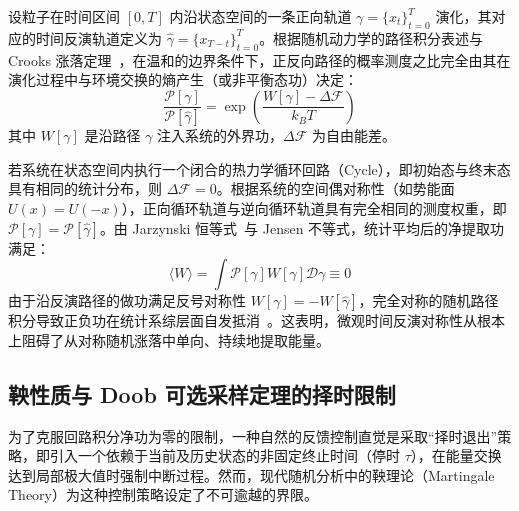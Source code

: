 ﻿\documentclass[10pt,a4paper]{article}
\numberwithin{equation}{section}
\begin{document}
设粒子在时间区间 $[0, T]$ 内沿状态空间的一条正向轨道 $\gamma = \{x_t\}_{t=0}^T$ 演化，其对应的时间反演轨道定义为 $\hat{\gamma} = \{x_{T-t}\}_{t=0}^T$。根据随机动力学的路径积分表述与 Crooks 涨落定理~\cite{Crooks1999}，在温和的边界条件下，正反向路径的概率测度之比完全由其在演化过程中与环境交换的熵产生（或非平衡态功）决定：
\begin{equation}
    \frac{\mathcal{P}[\gamma]}{\mathcal{P}[\hat{\gamma}]} = \exp\left( \frac{W[\gamma] - \Delta \mathcal{F}}{k_B T} \right)
\end{equation}
其中 $W[\gamma]$ 是沿路径 $\gamma$ 注入系统的外界功，$\Delta \mathcal{F}$ 为自由能差。

若系统在状态空间内执行一个闭合的热力学循环回路（Cycle），即初始态与终末态具有相同的统计分布，则 $\Delta \mathcal{F} = 0$。根据系统的空间偶对称性（如势能面 $U(x) = U(-x)$），正向循环轨道与逆向循环轨道具有完全相同的测度权重，即 $\mathcal{P}[\gamma] = \mathcal{P}[\hat{\gamma}]$。由 Jarzynski 恒等式~\cite{Jarzynski1997}与 Jensen 不等式，统计平均后的净提取功满足：
\begin{equation}
    \langle W \rangle = \int \mathcal{P}[\gamma] W[\gamma] \mathcal{D}\gamma \equiv 0
\end{equation}
由于沿反演路径的做功满足反号对称性 $W[\gamma] = -W[\hat{\gamma}]$，完全对称的随机路径积分导致正负功在统计系综层面自发抵消~\cite{Seifert2012}。这表明，微观时间反演对称性从根本上阻碍了从对称随机涨落中单向、持续地提取能量。

\subsection{鞅性质与 Doob 可选采样定理的择时限制}
\label{subsec:martingale_obstruction}

为了克服回路积分净功为零的限制，一种自然的反馈控制直觉是采取“择时退出”策略，即引入一个依赖于当前及历史状态的非固定终止时间（停时 $\tau$），在能量交换达到局部极大值时强制中断过程。然而，现代随机分析中的鞅理论（Martingale Theory）为这种控制策略设定了不可逾越的界限。
\end{document}

